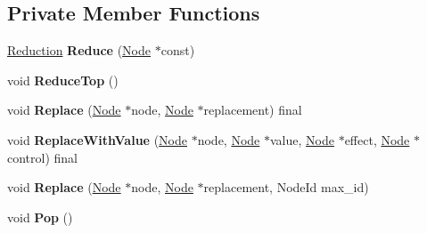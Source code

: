 \subsection*{Private Member Functions}
\begin{DoxyCompactItemize}
\item 
\hyperlink{classv8_1_1internal_1_1compiler_1_1_reduction}{Reduction} {\bfseries Reduce} (\hyperlink{classv8_1_1internal_1_1compiler_1_1_node}{Node} $\ast$const)\hypertarget{classv8_1_1internal_1_1compiler_1_1_graph_reducer_a76479ad03d91e0c833344e897bb0ab2a}{}\label{classv8_1_1internal_1_1compiler_1_1_graph_reducer_a76479ad03d91e0c833344e897bb0ab2a}

\item 
void {\bfseries Reduce\+Top} ()\hypertarget{classv8_1_1internal_1_1compiler_1_1_graph_reducer_a4a0f9062fa936af64e1ccec21a9039c2}{}\label{classv8_1_1internal_1_1compiler_1_1_graph_reducer_a4a0f9062fa936af64e1ccec21a9039c2}

\item 
void {\bfseries Replace} (\hyperlink{classv8_1_1internal_1_1compiler_1_1_node}{Node} $\ast$node, \hyperlink{classv8_1_1internal_1_1compiler_1_1_node}{Node} $\ast$replacement) final\hypertarget{classv8_1_1internal_1_1compiler_1_1_graph_reducer_aea0987915a8cd9261be11766cef32880}{}\label{classv8_1_1internal_1_1compiler_1_1_graph_reducer_aea0987915a8cd9261be11766cef32880}

\item 
void {\bfseries Replace\+With\+Value} (\hyperlink{classv8_1_1internal_1_1compiler_1_1_node}{Node} $\ast$node, \hyperlink{classv8_1_1internal_1_1compiler_1_1_node}{Node} $\ast$value, \hyperlink{classv8_1_1internal_1_1compiler_1_1_node}{Node} $\ast$effect, \hyperlink{classv8_1_1internal_1_1compiler_1_1_node}{Node} $\ast$control) final\hypertarget{classv8_1_1internal_1_1compiler_1_1_graph_reducer_a8954ce4fc9f4ef7c3260ec54c71b943f}{}\label{classv8_1_1internal_1_1compiler_1_1_graph_reducer_a8954ce4fc9f4ef7c3260ec54c71b943f}

\item 
void {\bfseries Replace} (\hyperlink{classv8_1_1internal_1_1compiler_1_1_node}{Node} $\ast$node, \hyperlink{classv8_1_1internal_1_1compiler_1_1_node}{Node} $\ast$replacement, Node\+Id max\+\_\+id)\hypertarget{classv8_1_1internal_1_1compiler_1_1_graph_reducer_a65c4f0e927451cd0b53c2285fd91b0c7}{}\label{classv8_1_1internal_1_1compiler_1_1_graph_reducer_a65c4f0e927451cd0b53c2285fd91b0c7}

\item 
void {\bfseries Pop} ()\hypertarget{classv8_1_1internal_1_1compiler_1_1_graph_reducer_aa8486c879b181741e8a05787e6a47da0}{}\label{classv8_1_1internal_1_1compiler_1_1_graph_reducer_aa8486c879b181741e8a05787e6a47da0}


\end{DoxyCompactItemize}
